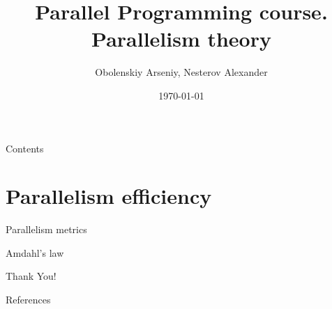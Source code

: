 \documentclass{beamer}
\title[Parallel Programming. Parallelism theory]{Parallel Programming course. Parallelism theory}
\author{Obolenskiy Arseniy, Nesterov Alexander}
\institute{Nizhny Novgorod State University}
\date{\today} %
\begin{document}
\begin{frame}
    \titlepage
\end{frame}

\begin{frame}{Contents}
    \tableofcontents
\end{frame}

\section{Parallelism efficiency}

\begin{frame}{Parallelism metrics}
\end{frame}

\begin{frame}{Amdahl's law}
\end{frame}

\begin{frame}
    \centering
    \Huge{Thank You!}
\end{frame}

\begin{frame}{References}
\end{frame}
\end{document}
